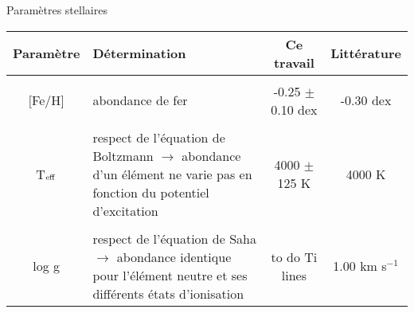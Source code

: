 \documentclass[10pt]{beamer}
\begin{document}
\begin{frame}[fragile]{Paramètres stellaires}







\begin{table}[h!]
    \begin{center}
        \begin{tabularx}{\textwidth}{c|X|c|c}
            Paramètre & Détermination & Ce travail & Littérature \\
            \hline
            &&\\
            $[$Fe/H$]$ &  abondance de fer & -0.25 $\pm$ 0.10 dex & -0.30 dex \\
            &&\\
            T$_{\rm eff}$ & respect de l'équation de Boltzmann $\rightarrow$  abondance d'un élément ne varie pas en fonction du potentiel d'excitation & 4000 $\pm$ 125 K  & 4000 K\\
            &&\\
            log g & respect de l'équation de Saha  $\rightarrow$ abondance identique pour l'élément neutre et ses différents états d'ionisation & to do Ti lines & 1.00 km s$^{-1}$\\
        \end{tabularx}
    \end{center}
\end{table}

\end{frame}
\end{document}
